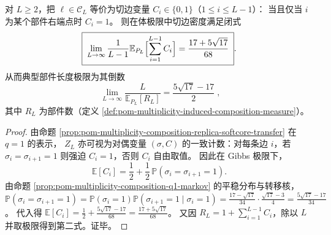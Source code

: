 \begin{corollary}\label{cor:pom-multiplicity-composition-cut-density}
对 \(L\ge 2\)，把 \(\boldsymbol{\ell}\in\mathcal{C}_L\) 等价为切边变量 \(C_i\in\{0,1\}\)（\(1\le i\le L-1\)）：
当且仅当 \(i\) 为某个部件右端点时 \(C_i=1\)。
则在体极限中切边密度满足闭式
\[
\boxed{\;
\lim_{L\to\infty}\frac{1}{L-1}\mathbb{E}_{P_L}\Bigl[\sum_{i=1}^{L-1}C_i\Bigr]
=\frac{17+5\sqrt{17}}{68}\; }.
\]
从而典型部件长度极限为其倒数
\[
\boxed{\;
\lim_{L\to\infty}\frac{L}{\mathbb{E}_{P_L}[R_L]}
=\frac{5\sqrt{17}-17}{2}\; } ,
\]
其中 \(R_L\) 为部件数（定义 \ref{def:pom-multiplicity-induced-composition-measure}）。
\end{corollary}
\begin{proof}
由命题 \ref{prop:pom-multiplicity-composition-replica-softcore-transfer} 在 \(q=1\) 的表示，
\(Z_L\) 亦可视为对偶变量 \((\sigma,C)\) 的一致计数：对每条边 \(i\)，若 \(\sigma_i=\sigma_{i+1}=1\) 则强迫 \(C_i=1\)，否则 \(C_i\) 自由取值。
因此在 Gibbs 极限下，
\[
\mathbb{E}[C_i]=\frac12+\frac12\,\mathbb{P}(\sigma_i=\sigma_{i+1}=1).
\]
由命题 \ref{prop:pom-multiplicity-composition-q1-markov} 的平稳分布与转移核，
\(
\mathbb{P}(\sigma_i=\sigma_{i+1}=1)=\mathbb{P}(\sigma_i=1)\mathbb{P}(\sigma_{i+1}=1\mid\sigma_i=1)
=\frac{17-\sqrt{17}}{34}\cdot \frac{\sqrt{17}-3}{4}
=\frac{5\sqrt{17}-17}{34}
\)。
代入得
\(
\mathbb{E}[C_i]=\frac12+\frac{5\sqrt{17}-17}{68}=\frac{17+5\sqrt{17}}{68}
\)。
又因 \(R_L=1+\sum_{i=1}^{L-1}C_i\)，除以 \(L\) 并取极限得到第二式。证毕。
\end{proof}

